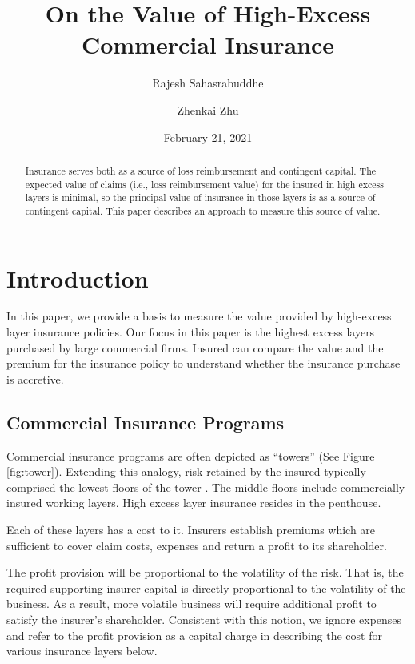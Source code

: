 \documentclass[
]{article}
\title{On the Value of High-Excess Commercial Insurance}
\author{Rajesh Sahasrabuddhe \and Zhenkai Zhu}
\date{February 21, 2021}
\begin{document}
\maketitle
\begin{abstract}
Insurance serves both as a source of loss reimbursement and contingent
capital. The expected value of claims (i.e., loss reimbursement value)
for the insured in high excess layers is minimal, so the principal value
of insurance in those layers is as a source of contingent capital. This
paper describes an approach to measure this source of value.
\end{abstract}

\raggedright

\hypertarget{introduction}{%
\section{Introduction}\label{introduction}}

In this paper, we provide a basis to measure the value provided by
high-excess layer insurance policies. Our focus in this paper is the
highest excess layers purchased by large commercial firms. Insured can
compare the value and the premium for the insurance policy to understand
whether the insurance purchase is accretive.

\hypertarget{commercial-insurance-programs}{%
\subsection{Commercial Insurance
Programs}\label{commercial-insurance-programs}}

Commercial insurance programs are often depicted as ``towers'' (See
Figure \ref{fig:tower}). Extending this analogy, risk retained by the
insured typically comprised the lowest floors of the tower . The middle
floors include commercially-insured working layers. High excess layer
insurance resides in the penthouse.

Each of these layers has a cost to it. Insurers establish premiums which
are sufficient to cover claim costs, expenses and return a profit to its
shareholder.

The profit provision will be proportional to the volatility of the risk.
That is, the required supporting insurer capital is directly
proportional to the volatility of the business. As a result, more
volatile business will require additional profit to satisfy the
insurer's shareholder. Consistent with this notion, we ignore expenses
and refer to the profit provision as a capital charge in describing the
cost for various insurance layers below.
\end{document}
